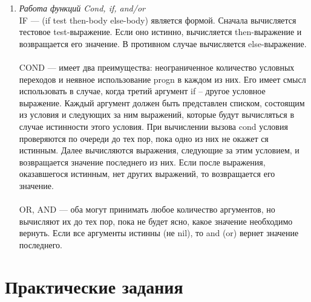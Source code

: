\begin{enumerate}[wide=0pt]
\item \textit{Работа функций Cond, if, and/or} \\
IF --- (if test then-body else-body) является формой. Сначала вычисляется тестовое test-выражение. Если оно истинно, вычисляется then-выражение и возвращается его значение. В противном случае вычисляется else-выражение. \\ \\
COND --- имеет два преимущества: неограниченное количество условных переходов и неявное использование progn в каждом из них. Его имеет смысл использовать в случае, когда третий аргумент if – другое условное выражение. Каждый аргумент должен быть представлен списком, состоящим из условия и следующих за ним выражений, которые будут вычисляться в случае истинности этого условия. При вычислении вызова cond условия проверяются по очереди до тех пор, пока одно из них не окажет ся истинным. Далее вычисляются выражения, следующие за этим условием, и возвращается значение последнего из них. Если после выражения,
оказавшегося истинным, нет других выражений, то возвращается его значение.\\\\
OR, AND --- оба могут принимать любое количество аргументов, но вычисляют их до тех пор, пока не будет ясно, какое значение необходимо вернуть. Если все аргументы истинны (не nil), то and (or) вернет значение последнего.


\end{enumerate}
\chapter{Практические задания}

